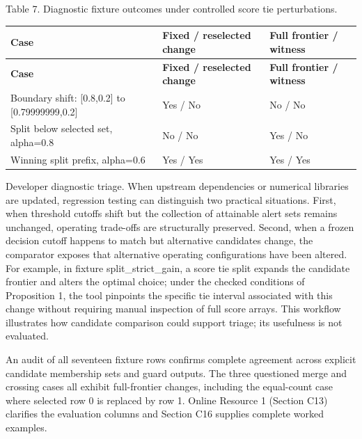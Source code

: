 \documentclass[11pt,a4paper]{article}
\begin{document}
Table 7. Diagnostic fixture outcomes under controlled score tie perturbations.

{\footnotesize
\setlength{\tabcolsep}{3pt}
\renewcommand{\arraystretch}{1.15}
\begin{longtable}{>{\raggedright\arraybackslash}p{0.46001\dimexpr\textwidth-6\tabcolsep\relax}>{\raggedright\arraybackslash}p{0.25000\dimexpr\textwidth-6\tabcolsep\relax}>{\raggedright\arraybackslash}p{0.28999\dimexpr\textwidth-6\tabcolsep\relax}}
\toprule
\textbf{Case} & \textbf{Fixed / reselected change} & \textbf{Full frontier / witness} \\
\midrule
\endfirsthead
\toprule
\textbf{Case} & \textbf{Fixed / reselected change} & \textbf{Full frontier / witness} \\
\midrule
\endhead
Boundary shift: [0.8,0.2] to [0.79999999,0.2] & Yes / No & No / No \\
Split below selected set, alpha=0.8 & No / No & Yes / No \\
Winning split prefix, alpha=0.6 & Yes / Yes & Yes / Yes \\
\bottomrule
\end{longtable}
}
Developer diagnostic triage. When upstream dependencies or numerical libraries are updated, regression testing can distinguish two practical situations. First, when threshold cutoffs shift but the collection of attainable alert sets remains unchanged, operating trade-offs are structurally preserved. Second, when a frozen decision cutoff happens to match but alternative candidates change, the comparator exposes that alternative operating configurations have been altered. For example, in fixture split\_strict\_gain, a score tie split expands the candidate frontier and alters the optimal choice; under the checked conditions of Proposition 1, the tool pinpoints the specific tie interval associated with this change without requiring manual inspection of full score arrays. This workflow illustrates how candidate comparison could support triage; its usefulness is not evaluated.

An audit of all seventeen fixture rows confirms complete agreement across explicit candidate membership sets and guard outputs. The three questioned merge and crossing cases all exhibit full-frontier changes, including the equal-count case where selected row 0 is replaced by row 1. Online Resource 1 (Section C13) clarifies the evaluation columns and Section C16 supplies complete worked examples.
\end{document}
